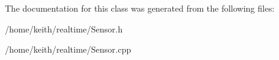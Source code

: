 The documentation for this class was generated from the following files\-:\begin{DoxyCompactItemize}
\item 
/home/keith/realtime/Sensor.\-h\item 
/home/keith/realtime/Sensor.\-cpp\end{DoxyCompactItemize}
